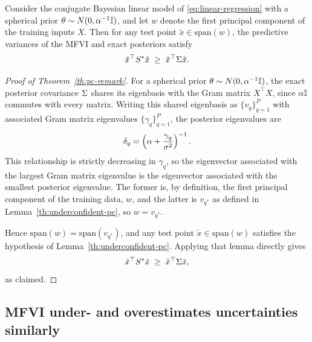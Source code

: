 \begin{theorem*}
Consider the conjugate Bayesian linear model of \cref{eq:linear-regression} with a spherical prior $\theta \sim N(0, \alpha^{-1} \mathbb{I})$, and let $w$ denote the first principal component of the training inputs $X$. Then for any test point $\tilde x \in \text{span}(w)$, the predictive variances of the MFVI and exact posteriors satisfy
\begin{equation}
    \tilde x^\top S^* \tilde x \;\geq\; \tilde x^\top \Sigma \tilde x.
\end{equation}
\end{theorem*}
\begin{proof}[Proof of Theorem~\ref{th:pc-remark}]
For a spherical prior $\theta \sim N(0, \alpha^{-1}\mathbb{I})$, the exact posterior covariance $\Sigma$ shares its eigenbasis with the Gram matrix $X^\top X$, since $\alpha \mathbb{I}$ commutes with every matrix. Writing this shared eigenbasis as $\{v_q\}_{q=1}^P$ with associated Gram matrix eigenvalues $\{\gamma_q\}_{q=1}^P$, the posterior eigenvalues are
\begin{equation}\label{eq:remark-eigvals}
    \delta_q = \left(\alpha + \frac{\gamma_q}{\sigma^2}\right)^{-1}.
\end{equation}
This relationship is strictly decreasing in $\gamma_q$, so the eigenvector associated with the largest Gram matrix eigenvalue is the eigenvector associated with the smallest posterior eigenvalue. The former is, by definition, the first principal component of the training data, $w$, and the latter is $v_{q^*}$ as defined in Lemma~\ref{th:underconfident-pc}, so $w = v_{q^*}$. 

Hence $\text{span}(w) = \text{span}(v_{q^*})$, and any test point $\tilde x \in \text{span}(w)$ satisfies the hypothesis of Lemma~\ref{th:underconfident-pc}. Applying that lemma directly gives
\begin{equation}
    \tilde x^\top S^* \tilde x \;\geq\; \tilde x^\top \Sigma \tilde x,
\end{equation}
as claimed.
\end{proof}

\subsection{MFVI under- and overestimates uncertainties similarly}

